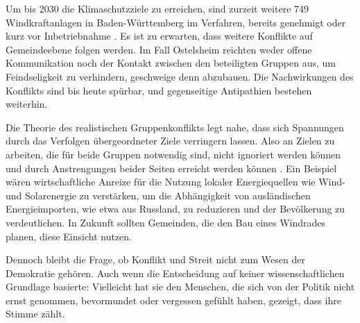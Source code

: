 \documentclass[12pt,a4paper]{article}
\begin{document}
Um bis 2030 die Klimaschutzziele zu erreichen, sind zurzeit weitere 749
Windkraftanlagen in Baden-Württemberg im Verfahren, bereits genehmigt oder kurz
vor Inbetriebnahme \cite{umwelt2024}. Es ist zu erwarten, dass weitere
Konflikte auf Gemeindeebene folgen werden. Im Fall Ostelsheim reichten weder
offene Kommunikation noch der Kontakt zwischen den beteiligten Gruppen aus, um
Feindseligkeit zu verhindern, geschweige denn abzubauen. Die Nachwirkungen des
Konflikts sind bis heute spürbar, und gegenseitige Antipathien bestehen
weiterhin.

Die Theorie des realistischen Gruppenkonflikts legt nahe, dass sich Spannungen
durch das Verfolgen übergeordneter Ziele verringern lassen. Also an Zielen zu
arbeiten, die für beide Gruppen notwendig sind, nicht ignoriert werden können
und durch Anstrengungen beider Seiten erreicht werden können
\cite{jackson1993}. Ein Beispiel wären wirtschaftliche Anreize für die Nutzung
lokaler Energiequellen wie Wind- und Solarenergie zu verstärken, um die
Abhängigkeit von ausländischen Energieimporten, wie etwa aus Russland, zu
reduzieren und der Bevölkerung zu verdeutlichen. In Zukunft sollten Gemeinden,
die den Bau eines Windrades planen, diese Einsicht nutzen.

Dennoch bleibt die Frage, ob Konflikt und Streit nicht zum Wesen der Demokratie
gehören. Auch wenn die Entscheidung auf keiner wissenschaftlichen Grundlage
basierte: Vielleicht hat sie den Menschen, die sich von der Politik nicht ernst
genommen, bevormundet oder vergessen gefühlt haben, gezeigt, dass ihre Stimme
zählt.


\clearpage


\end{document}
